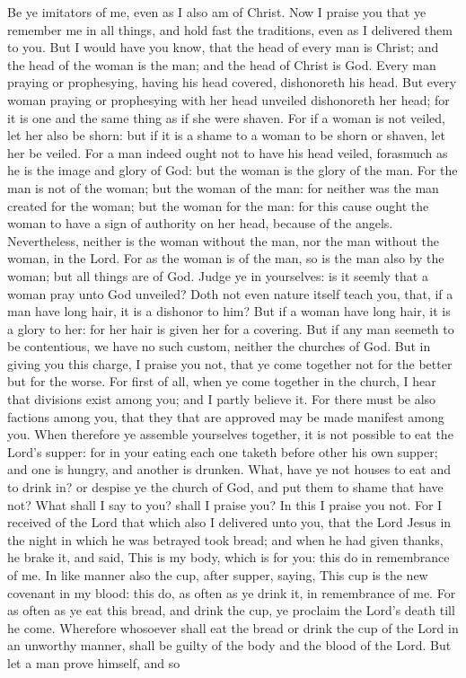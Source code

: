 Be ye imitators of me, even as I also am of Christ.  Now I praise you that ye remember me in all things, and hold fast the traditions, even as I delivered them to you. But I would have you know, that the head of every man is Christ; and the head of the woman is the man; and the head of Christ is God. Every man praying or prophesying, having his head covered, dishonoreth his head. But every woman praying or prophesying with her head unveiled dishonoreth her head; for it is one and the same thing as if she were shaven. For if a woman is not veiled, let her also be shorn: but if it is a shame to a woman to be shorn or shaven, let her be veiled. For a man indeed ought not to have his head veiled, forasmuch as he is the image and glory of God: but the woman is the glory of the man. For the man is not of the woman; but the woman of the man: for neither was the man created for the woman; but the woman for the man: for this cause ought the woman to have a sign of authority on her head, because of the angels. Nevertheless, neither is the woman without the man, nor the man without the woman, in the Lord. For as the woman is of the man, so is the man also by the woman; but all things are of God. Judge ye in yourselves: is it seemly that a woman pray unto God unveiled? Doth not even nature itself teach you, that, if a man have long hair, it is a dishonor to him? But if a woman have long hair, it is a glory to her: for her hair is given her for a covering. But if any man seemeth to be contentious, we have no such custom, neither the churches of God.  But in giving you this charge, I praise you not, that ye come together not for the better but for the worse. For first of all, when ye come together in the church, I hear that divisions exist among you; and I partly believe it. For there must be also factions among you, that they that are approved may be made manifest among you. When therefore ye assemble yourselves together, it is not possible to eat the Lord’s supper: for in your eating each one taketh before other his own supper; and one is hungry, and another is drunken. What, have ye not houses to eat and to drink in? or despise ye the church of God, and put them to shame that have not? What shall I say to you? shall I praise you? In this I praise you not. For I received of the Lord that which also I delivered unto you, that the Lord Jesus in the night in which he was betrayed took bread; and when he had given thanks, he brake it, and said, This is my body, which is for you: this do in remembrance of me. In like manner also the cup, after supper, saying, This cup is the new covenant in my blood: this do, as often as ye drink it, in remembrance of me. For as often as ye eat this bread, and drink the cup, ye proclaim the Lord’s death till he come. Wherefore whosoever shall eat the bread or drink the cup of the Lord in an unworthy manner, shall be guilty of the body and the blood of the Lord. But let a man prove himself, and so 